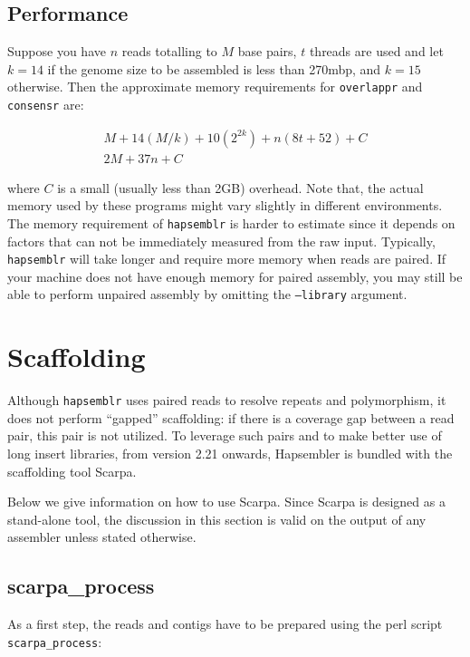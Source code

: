 \documentclass[12pt,a4paper]{report}
\newcommand{\hapversion}{2.21}
\begin{document}
\subsection{Performance}

Suppose you have $n$ reads totalling to $M$ base pairs, $t$ threads are used and let $k=14$ if the genome size to be assembled is less than 270mbp, and $k=15$ otherwise. Then the approximate memory requirements for \texttt{overlappr} and \texttt{consensr} are:

\begin{eqnarray}
M + 14(M/k) + 10(2^{2k}) + n(8t + 52) + C \\
2M + 37n + C
\end{eqnarray}

where $C$ is a small (usually less than 2GB) overhead. Note that, the actual memory used by these programs might vary slightly in different environments. The memory requirement of \texttt{hapsemblr} is harder to estimate since it depends on factors that can not be immediately measured from the raw input. Typically, \texttt{hapsemblr} will take longer and require more memory when reads are paired. If your machine does not have enough memory for paired assembly, you may still be able to perform unpaired assembly by omitting the \texttt{--library} argument.

\section{Scaffolding}
\label{scaff}

Although \texttt{hapsemblr} uses paired reads to resolve repeats and polymorphism, it does not perform ``gapped'' scaffolding: if there is a coverage gap between a read pair, this pair is not utilized. To leverage such pairs and to make better use of long insert libraries, from version \hapversion{} onwards, Hapsembler is bundled with the scaffolding tool Scarpa. 

Below we give information on how to use Scarpa. Since Scarpa is designed as a stand-alone tool, the discussion in this section is valid on the output of any assembler unless stated otherwise.

\subsection{scarpa\_process}

As a first step, the reads and contigs have to be prepared using the perl script \texttt{scarpa\_process}:
\end{document}
